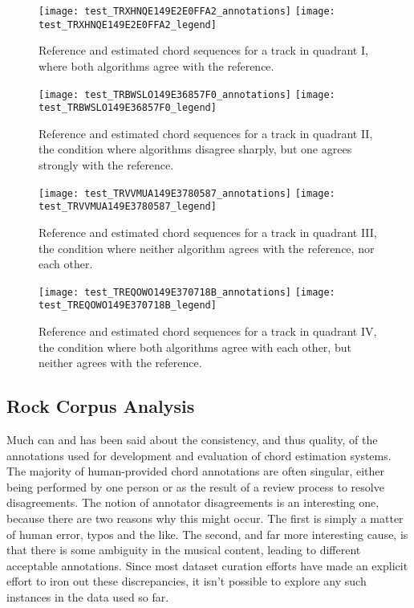 \begin{figure}[t]
\centering
\texttt{[image: test\_TRXHNQE149E2E0FFA2\_annotations]}
\texttt{[image: test\_TRXHNQE149E2E0FFA2\_legend]}
\caption{Reference and estimated chord sequences for a track in quadrant I, where both algorithms agree with the reference.}
\label{fig:test_quadI}
\end{figure}

\begin{figure}[t]
\centering
\texttt{[image: test\_TRBWSLO149E36857F0\_annotations]}
\texttt{[image: test\_TRBWSLO149E36857F0\_legend]}
\caption{Reference and estimated chord sequences for a track in quadrant II, the condition where algorithms disagree sharply, but one agrees strongly with the reference.}
\label{fig:test_quadII}
\end{figure}

\begin{figure}[t]
\centering
\texttt{[image: test\_TRVVMUA149E3780587\_annotations]}
\texttt{[image: test\_TRVVMUA149E3780587\_legend]}
\caption{Reference and estimated chord sequences for a track in quadrant III, the condition where neither algorithm agrees with the reference, nor each other.}
\label{fig:test_quadIII}
\end{figure}

\begin{figure}[t]
\centering
\texttt{[image: test\_TREQOWO149E370718B\_annotations]}
\texttt{[image: test\_TREQOWO149E370718B\_legend]}
\caption{Reference and estimated chord sequences for a track in quadrant IV, the condition where both algorithms agree with each other, but neither agrees with the reference.}
\label{fig:test_quadIV}
\end{figure}




\subsection{Rock Corpus Analysis}
\label{subsec:qualitative_analysis}

Much can and has been said about the consistency, and thus quality, of the annotations used for development and evaluation of chord estimation systems.
The majority of human-provided chord annotations are often singular, either being performed by one person or as the result of a review process to resolve disagreements.
The notion of annotator disagreements is an interesting one, because there are two reasons why this might occur.
The first is simply a matter of human error, typos and the like.
The second, and far more interesting cause, is that there is some ambiguity in the musical content, leading to different acceptable annotations.
Since most dataset curation efforts have made an explicit effort to iron out these discrepancies, it isn't possible to explore any such instances in the data used so far.


